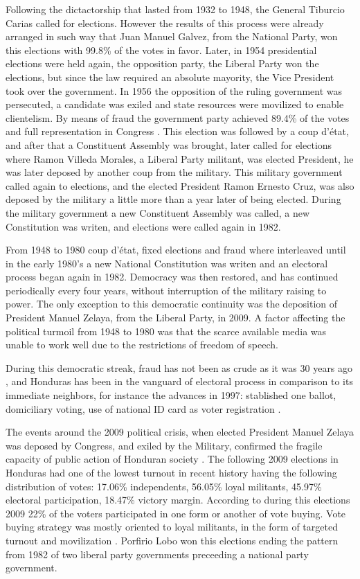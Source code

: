 \documentclass[a4paper,10pt]{article}
\begin{document}
Following the dictactorship that lasted from 1932 to 1948, the General Tiburcio Carias called for elections. However the results of this process were already arranged in such way that Juan Manuel Galvez, from the National Party, won this elections with 99.8\% of the votes in favor. Later, in 1954 presidential elections were held again, the opposition party, the Liberal Party won the elections, but since the law required an absolute mayority, the Vice President took over the government. In 1956 the opposition of the ruling government was persecuted, a candidate was exiled and state resources were movilized to enable clientelism. By means of fraud the government party achieved 89.4\% of the votes and full representation in Congress \citep{romero2014}. This election was followed by a coup d'\'{e}tat, and after that a Constituent Assembly was brought, later called for elections where Ramon Villeda Morales, a Liberal Party militant, was elected President, he was later deposed by another coup from the military. This military government called again to elections, and the elected President Ramon Ernesto Cruz, was also deposed by the military a little more than a year later of being elected. During the military government a new Constituent Assembly was called, a new Constitution was writen, and elections were called again in 1982.

From 1948 to 1980 coup d'\'{e}tat, fixed elections and fraud where interleaved until in the early 1980's a new National Constitution was writen and an electoral process began again in 1982. Democracy was then restored, and has continued periodically every four years, without interruption of the military raising to power. The only exception to this democratic continuity was the deposition of President Manuel Zelaya, from the Liberal Party, in 2009. A factor affecting the political turmoil from 1948 to 1980 was that the scarce available media was unable to work well due to the restrictions of freedom of speech. 

During this democratic streak, fraud has not been as crude as it was 30 years ago \citep{romero2014}, and Honduras has been in the vanguard of electoral process in comparison to its immediate neighbors, for instance the advances in 1997: stablished one ballot, domiciliary voting, use of national ID card as voter registration \citep{romero2014}.

The events around the 2009 political crisis, when elected President Manuel Zelaya was deposed by Congress, and exiled by the Military, confirmed the fragile capacity of public action of Honduran society \citep{romero2014}. The following 2009 elections in Honduras had one of the lowest turnout in recent history having the following distribution of votes: 17.06\% independents, 56.05\% loyal militants, 45.97\% electoral participation, 18.47\% victory margin. According to \cite{gonza2014} during this elections 2009 22\% of the voters participated in one form or another of vote buying. Vote buying strategy was mostly oriented to loyal militants, in the form of targeted turnout and movilization \citep{gonza2014}. Porfirio Lobo won this elections ending the pattern from 1982 of two liberal party governments preceeding a national party government.
\end{document}
